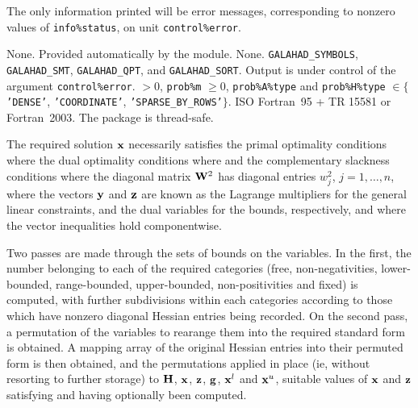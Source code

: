 \documentclass{galahad}
\begin{document}

\galinfo
The only information printed will be error messages, corresponding to 
nonzero values of {\tt info\%status}, on unit {\tt control\%error}. 


\galgeneral

\galcommon None.
\galworkspace Provided automatically by the module.
\galroutines None. 
\galmodules 
{\tt GALAHAD\_SY\-M\-BOLS}, 
{\tt GALAHAD\_SMT}, 
{\tt GALAHAD\_QPT},
and {\tt GALAHAD\_SORT}.
\galio Output is under control of the argument {\tt control\%error}.
 $> 0$, {\tt prob\%m} $\geq  0$, 
{\tt prob\%A\%type} and {\tt prob\%H\%type} $\in \{${\tt 'DENSE'}, 
 {\tt 'COORDINATE'}, {\tt 'SPARSE\_BY\_ROWS'}$\}$. 
\galportability ISO Fortran~95 + TR 15581 or Fortran~2003. The package is thread-safe.


\galmethod
The required solution ${\mathbf{x}}$ necessarily satisfies 
the primal optimality conditions
where
the dual optimality conditions
where
and the complementary slackness conditions 
where the diagonal matrix ${\mathbf{W}}^{2}$ has diagonal entries $w_{j}^{2}$,
$j = 1, \ldots , n$, where the vectors ${\mathbf{y}}$ and ${\mathbf{z}}$ are 
known as the Lagrange multipliers for
the general linear constraints, and the dual variables for the bounds,
respectively, and where the vector inequalities hold componentwise.

Two passes are made through the sets of bounds on the variables. 
In the first, the number belonging to each of the required categories 
(free, non-negativities, lower-bounded, range-bounded, 
upper-bounded, non-positivities and fixed) is computed, with further 
subdivisions within each categories according to those which have 
nonzero diagonal Hessian entries being recorded. On the second pass, a 
permutation of the variables to rearange them into the required standard form 
is obtained. A mapping array of the original Hessian entries into their 
permuted form is then obtained, and the permutations applied in place 
(ie, without resorting to further storage) to ${\mathbf{H}}$, ${\mathbf{x}}$, ${\mathbf{z}}$, ${\mathbf{g}}$, 
${\mathbf{x}}^l$ and ${\mathbf{x}}^u$, suitable values of ${\mathbf{x}}$ and ${\mathbf{z}}$ 
satisfying  and  having optionally been computed. 
 
\end{document}

